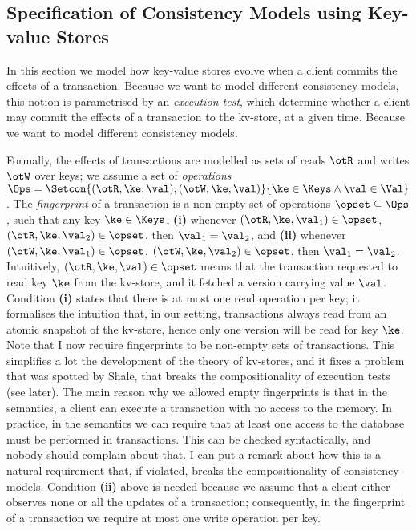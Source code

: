 \subsection{Specification of Consistency Models using Key-value Stores}
\label{sec:execution.tests}

In this section we model how key-value stores evolve when a client commits 
the effects of a transaction.
Because we want to model different consistency models, 
this notion is parametrised by an \emph{execution test}, which determine whether 
a client may commit the effects of a transaction to the kv-store, at a given time.
Because we want to model different consistency models.

Formally, the effects of transactions are modelled as sets of reads \( \otR \) and writes \( \otW \)
over keys; we assume a set of \emph{operations} $\Ops = \Setcon{(\otR, \ke, \val), (\otW, \ke, \val) }{ \ke \in \Keys \wedge 
\val \in \Val }$. The \emph{fingerprint} of a transaction is a non-empty set of operations $\opset \subseteq \Ops$, such that any key $\ke \in \Keys$,
\textbf{(i)} whenever $(\otR, \ke, \val_1) \in \opset$, $(\otR, \ke, \val_2) \in \opset$, then $\val_1 = \val_2$, 
and \textbf{(ii)} whenever $(\otW, \ke, \val_1) \in \opset$, $(\otW, \ke, \val_2) \in \opset$, then $\val_1 = \val_2$. 
Intuitively, $(\otR, \ke, \val) \in \opset$ means that the transaction requested to read key $\ke$ from the kv-store, 
and it fetched a version carrying value $\val$. Condition \textbf{(i)} states that there is at most one read operation per key; it  
formalises the intuition that, in our setting, 
transactions always read from an atomic snapshot of the kv-store, hence only one version will be read for key $\ke$. 
\ac{Note that I now require fingerprints to be non-empty sets of transactions. This simplifies a lot the development of 
the theory of kv-stores, and it fixes a problem that was spotted by Shale, that breaks the compositionality of 
execution tests (see later). The main reason why we allowed empty fingerprints is that in the semantics, a client can 
execute a transaction with no access to the memory. In practice, in the semantics we can require that at least 
one access to the database must be performed in transactions. This can be checked syntactically, and nobody 
should complain about that. I can put a remark about how this is a natural requirement that, if violated, 
breaks the compositionality of consistency models.}
Condition \textbf{(ii)} above is needed because we assume that a client either observes none or all the updates 
of a transaction; consequently, in the fingerprint of a transaction we require at most one write operation per key. 

